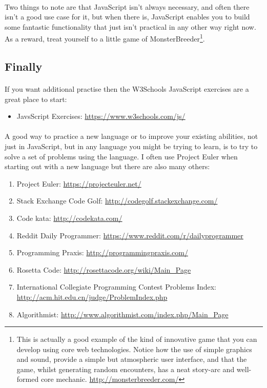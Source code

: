 \documentclass[10pt, a4paper]{article}
\begin{document}
\paragraph{} Two things to note are that JavaScript isn't always necessary, and often there isn't a good use case for it, but when there is, JavaScript enables you to build some fantastic functionality that just isn't practical in any other way right now. As a reward, treat yourself to a little game of MonsterBreeder\footnote{This is actually a good example of the kind of innovative game that you can develop using core web technologies. Notice how the use of simple graphics and sound, provide a simple but atmospheric user interface, and that the game, whilst generating random encounters, has a neat story-arc and well-formed core mechanic. \url{http://monsterbreeder.com/}}.

\subsection{Finally}
\paragraph{} If you want additional practise then the W3Schools JavaScript exercises are a great place to start:
\begin{itemize}
\item JavsScript Exercises: \url{https://www.w3schools.com/js/}
\end{itemize}

\paragraph{} A good way to practice a new language or to improve your existing abilities, not just in JavaScript, but in any language you might be trying to learn, is to try to solve a set of problems using the language. I often use Project Euler when starting out with a new language but there are also many others:

\begin{enumerate}
\item Project Euler: \url{https://projecteuler.net/}
\item Stack Exchange Code Golf: \url{http://codegolf.stackexchange.com/}
\item Code kata: \url{http://codekata.com/}
\item Reddit Daily Programmer: \url{https://www.reddit.com/r/dailyprogrammer}
\item Programming Praxis: \url{http://programmingpraxis.com/}
\item Rosetta Code: \url{http://rosettacode.org/wiki/Main_Page}
\item International Collegiate Programming Contest Problems Index: \url{http://acm.hit.edu.cn/judge/ProblemIndex.php}
\item Algorithmist: \url{http://www.algorithmist.com/index.php/Main_Page}
\end{enumerate}
\end{document}
